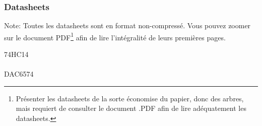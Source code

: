 \begin{spacing}{1.5}



\pagebreak
\subsubsection{Datasheets}
Note: Toutes les datasheets sont en format non-compressé. Vous pouvez zoomer sur le document PDF\footnote{Présenter les datasheets de la sorte économise du papier, donc des arbres, mais requiert de consulter le document .PDF afin de lire adéquatement les datasheets.} afin de lire l'intégralité de leurs premières pages.
\begin{multicols}{3}
74HC14\\
\\
DAC6574\\

\end{multicols}
\end{spacing}
